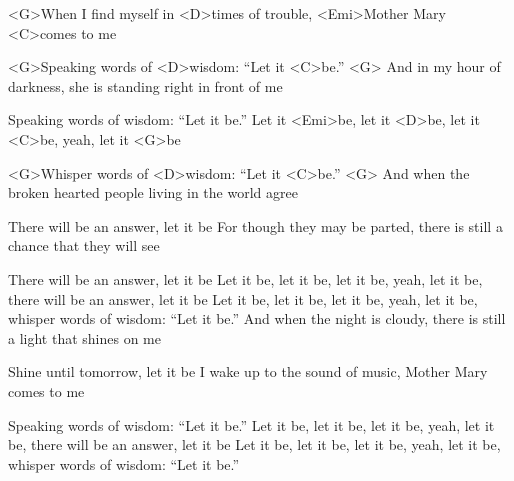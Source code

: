 

\zs
<G>When I find myself in <D>times of trouble,
<Emi>Mother Mary <C>comes to me

<G>Speaking words of <D>wisdom: ``Let it <C>be.'' <G>
\ks
\zs
And in my hour of darkness,
she is standing right in front of me

Speaking words of wisdom: ``Let it be.''
\ks
\zr
Let it <Emi>be, let it <D>be, let it <C>be, yeah, let it <G>be

<G>Whisper words of <D>wisdom: ``Let it <C>be.'' <G>
\kr
\zs
And when the broken hearted people
living in the world agree

There will be an answer, let it be
\ks
\zs
For though they may be parted,
there is still a chance that they will see

There will be an answer, let it be
\ks
\zr
Let it be, let it be, let it be, yeah, let it be,
there will be an answer, let it be
\kr
\zr
Let it be, let it be, let it be, yeah, let it be,
whisper words of wisdom: ``Let it be.''
\kr
\zs
And when the night is cloudy,
there is still a light that shines on me

Shine until tomorrow, let it be
\ks
\zs
I wake up to the sound of music,
Mother Mary comes to me

Speaking words of wisdom: ``Let it be.''
\ks
\zr
Let it be, let it be, let it be, yeah, let it be,
there will be an answer, let it be
\kr
\zr
Let it be, let it be, let it be, yeah, let it be,
whisper words of wisdom: ``Let it be.''
\kr

\kp





